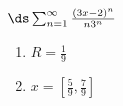 {$\ds\sum_{n=1}^\infty \frac{(3x-2)^n}{n3^n}$}
{\begin{enumerate}
	\item $R=\frac19$
	\item $x=[\frac59,\frac79]$
\end{enumerate}}